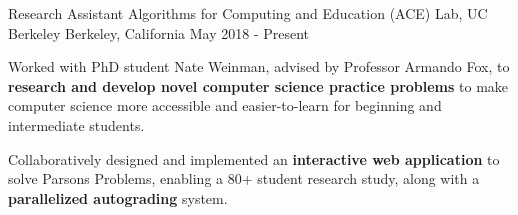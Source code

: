 \begin{cventries}
    \cventry
      {Research Assistant}
      {Algorithms for Computing and Education (ACE) Lab, UC Berkeley}
      {Berkeley, California}
      {May 2018 - Present}
      {
        \begin{cvitems}
          \item Worked with PhD student Nate Weinman, advised by Professor Armando Fox, to \textbf{research and develop novel computer science practice problems}
          to make computer science more accessible and easier-to-learn for beginning and intermediate students.
          \item Collaboratively designed and implemented an \textbf{interactive web application} to solve Parsons Problems, enabling a 80+ student research study, along with a \textbf{parallelized autograding} system. 
        \end{cvitems}  
      }

\end{cventries}

